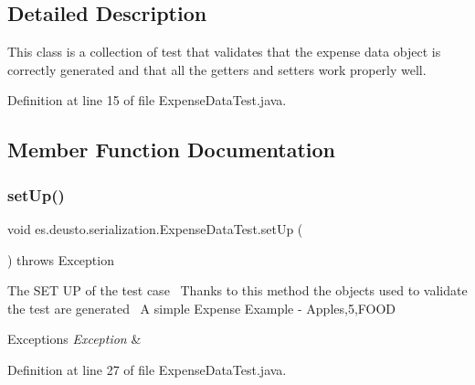\subsection{Detailed Description}
This class is a collection of test that validates that the expense data object is correctly generated and that all the getters and setters work properly well. 

Definition at line 15 of file Expense\+Data\+Test.\+java.



\subsection{Member Function Documentation}
\mbox{\label{classes_1_1deusto_1_1serialization_1_1_expense_data_test_a8daee57c8227b100656635d3739be30a}} 
\subsubsection{\texorpdfstring{set\+Up()}{setUp()}}
{\footnotesize\ttfamily void es.\+deusto.\+serialization.\+Expense\+Data\+Test.\+set\+Up (\begin{DoxyParamCaption}{ }\end{DoxyParamCaption}) throws Exception}

The S\+ET UP of the test case~\newline
Thanks to this method the objects used to validate the test are generated~\newline
A simple Expense Example -\/ Apples,5,F\+O\+OD 
\begin{DoxyExceptions}{Exceptions}
{\em Exception} & \\
\hline
\end{DoxyExceptions}


Definition at line 27 of file Expense\+Data\+Test.\+java.

\mbox{\label{classes_1_1deusto_1_1serialization_1_1_expense_data_test_af9c32f440da4f2b48125f23ff6816c43}} 
